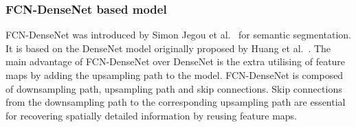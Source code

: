 	\subsubsection{FCN-DenseNet based model}
	FCN-DenseNet was introduced by Simon Jegou et al.~\cite{jegou2017one} for semantic segmentation.
	It is based on the DenseNet model originally proposed by Huang et al.~\cite{Huang}. 
	The main advantage of FCN-DenseNet over DenseNet is the extra utilising of feature maps by adding the upsampling path to the model.
	FCN-DenseNet is composed of downsampling path, upsampling path and skip connections.
	Skip connections from the downsampling path to the corresponding upsampling path are essential for recovering spatially detailed information by reusing feature maps.
 
